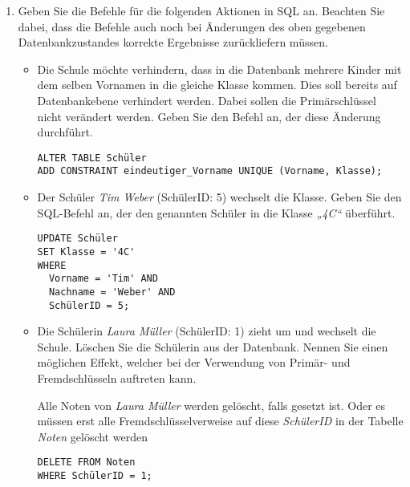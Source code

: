 \documentclass{bschlangaul-aufgabe}
\begin{document}
\begin{enumerate}

\item Geben Sie die Befehle für die folgenden Aktionen in SQL an.
Beachten Sie dabei, dass die Befehle auch noch bei Änderungen des oben
gegebenen Datenbankzustandes korrekte Ergebnisse zurückliefern müssen.

\begin{itemize}
\item Die Schule möchte verhindern, dass in die Datenbank mehrere Kinder
mit dem selben Vornamen in die gleiche Klasse kommen. Dies soll bereits
auf Datenbankebene verhindert werden. Dabei sollen die Primärschlüssel
nicht verändert werden. Geben Sie den Befehl an, der diese Änderung
durchführt.

\begin{bAntwort}
\begin{verbatim}
ALTER TABLE Schüler
ADD CONSTRAINT eindeutiger_Vorname UNIQUE (Vorname, Klasse);
\end{verbatim}
\end{bAntwort}

\item Der Schüler \emph{Tim Weber} (SchülerID: 5) wechselt die Klasse.
Geben Sie den SQL-Befehl an, der den genannten Schüler in die Klasse
\emph{„4C“} überführt.

\begin{bAntwort}
\begin{verbatim}
UPDATE Schüler
SET Klasse = '4C'
WHERE
  Vorname = 'Tim' AND
  Nachname = 'Weber' AND
  SchülerID = 5;
\end{verbatim}
\end{bAntwort}

\item Die Schülerin \emph{Laura Müller} (SchülerID: 1) zieht um und
wechselt die Schule. Löschen Sie die Schülerin aus der Datenbank. Nennen
Sie einen möglichen Effekt, welcher bei der Verwendung von Primär- und
Fremdschlüsseln auftreten kann.

\begin{bAntwort}
Alle Noten von \emph{Laura Müller} werden gelöscht, falls  gesetzt ist. Oder es müssen erst alle Fremdschlüsselverweise
auf diese \emph{SchülerID} in der Tabelle \emph{Noten} gelöscht werden

\begin{verbatim}
DELETE FROM Noten
WHERE SchülerID = 1;
\end{verbatim}
\end{bAntwort}


\end{itemize}
\end{enumerate}
\end{document}
